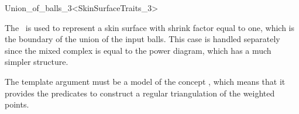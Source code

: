 
\begin{ccRefClass}{Union_of_balls_3<SkinSurfaceTraits_3>}
  \ccDefinition

  The \ccRefName\ is used to represent a skin surface with shrink
  factor equal to one, which is the boundary of the union of the input
  balls.  This case is handled separately since the mixed complex is
  equal to the power diagram, which has a much simpler structure.

  The template argument must be a model of the concept
  , which means that it provides the
  predicates to construct a regular triangulation of the weighted
  points.
  




  \ccIsModel {} 


\end{ccRefClass}
